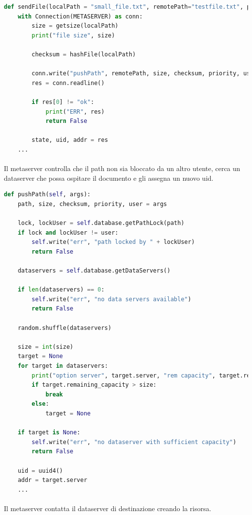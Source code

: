 \documentclass{article}
\begin{document}
\begin{lstlisting}[language=Python, title=Client]
def sendFile(localPath = "small_file.txt", remotePath="testfile.txt", priority=1, user="default"):
    with Connection(METASERVER) as conn:
        size = getsize(localPath)
        print("file size", size)

        checksum = hashFile(localPath)

        conn.write("pushPath", remotePath, size, checksum, priority, user)
        res = conn.readline()

        if res[0] != "ok":
            print("ERR", res)
            return False

        state, uid, addr = res
    ...
\end{lstlisting}

\paragraph{} Il metaserver controlla che il path non sia bloccato da un altro utente, cerca un dataserver che possa ospitare il documento e gli assegna un nuovo uid.

\begin{lstlisting}[language=Python, title=Metaserver]
def pushPath(self, args):
    path, size, checksum, priority, user = args

    lock, lockUser = self.database.getPathLock(path)
    if lock and lockUser != user:
        self.write("err", "path locked by " + lockUser)
        return False
    
    dataservers = self.database.getDataServers()

    if len(dataservers) == 0:
        self.write("err", "no data servers available")
        return False

    random.shuffle(dataservers)

    size = int(size)
    target = None
    for target in dataservers:
        print("option server", target.server, "rem capacity", target.remaining_capacity, "file size", size)
        if target.remaining_capacity > size:
            break
        else:
            target = None

    if target is None:
        self.write("err", "no dataserver with sufficient capacity")
        return False

    uid = uuid4()
    addr = target.server
    ...
\end{lstlisting}

\paragraph{} Il metaserver contatta il dataserver di destinazione creando la risorsa.
\end{document}
